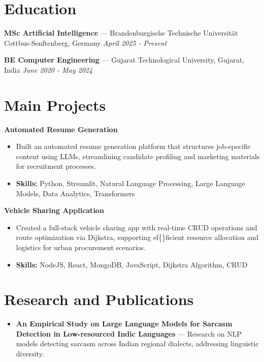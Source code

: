 \documentclass[a4paper,10pt]{article}
\begin{document}
\section*{Education}
\textbf{MSc Artificial Intelligence} — Brandenburgische Technische Universität Cottbus-Senftenberg, Germany \hfill \textit{April 2025 - Present}\par
\vspace{1.5pt}
\textbf{BE Computer Engineering} — Gujarat Technological University, Gujarat, India \hfill \textit{June 2020 - May 2024}\par

\section*{Main Projects}
\textbf{Automated Resume Generation}\par
\vspace{1pt}
\begin{itemize}
  \item Built an automated resume generation platform that structures job-specific content using LLMs, streamlining candidate profiling and marketing materials for recruitment processes.
  \item \textbf{Skills:} Python, Streamlit, Natural Language Processing, Large Language Models, Data Analytics, Transformers
\end{itemize}
\vspace{3pt}
\textbf{Vehicle Sharing Application}\par
\vspace{1pt}
\begin{itemize}
  \item Created a full-stack vehicle sharing app with real-time CRUD operations and route optimization via Dijkstra, supporting ef\{\}ficient resource allocation and logistics for urban procurement scenarios.
  \item \textbf{Skills:} NodeJS, React, MongoDB, JavaScript, Dijkstra Algorithm, CRUD
\end{itemize}

\section*{Research and Publications}
\begin{itemize}
\item \textbf{An Empirical Study on Large Language Models for Sarcasm Detection in Low-resourced Indic Languages} — Research on NLP models detecting sarcasm across Indian regional dialects, addressing linguistic diversity.
\end{itemize}
\end{document}
